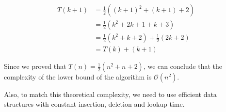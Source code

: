 \begin{align}
    T(k+1)&=\frac{1}{2}((k+1)^2+(k+1)+2)\\
    &=\frac{1}{2}(k^2+2k+1+k+3)\\
    &=\frac{1}{2}(k^2+k+2)+\frac{1}{2}(2k+2)\\
    &=T(k)+(k+1)
\end{align}

Since we proved that $T(n)=\frac{1}{2}(n^2+n+2)$, we can conclude that the complexity
of the lower bound of the algorithm is $\mathcal{O}(n^2)$. \newline

Also, to match this theoretical complexity, we need to use efficient data structures
with constant insertion, deletion and lookup time. \newline